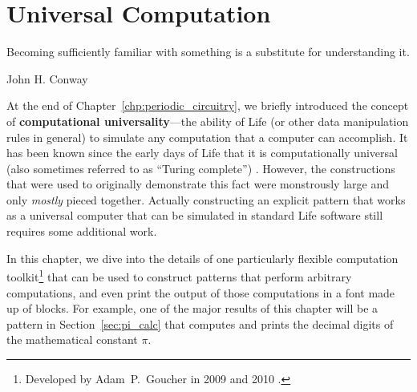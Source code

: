 

\renewcommand{\chapterfolder}{universal_computation/}
\chapter{Universal Computation}\label{chp:universal_computation}


\vspace*{-0.4in}
\epigraph{Becoming sufficiently familiar with something is a substitute for understanding it.}{John H. Conway}
\vspace*{0.4in}


\noindent At the end of Chapter~\ref{chp:periodic_circuitry}, we briefly introduced the concept of \textbf{computational universality}---the ability of Life (or other data manipulation rules in general) to simulate any computation that a computer can accomplish. It has been known since the early days of Life that it is computationally universal (also sometimes referred to as ``Turing complete'') \cite{Wain74,BCG82}.  However, the constructions that were used to originally demonstrate this fact were monstrously large and only \emph{mostly} pieced together. Actually constructing an explicit pattern that works as a universal computer that can be simulated in standard Life software still requires some additional work.

In this chapter, we dive into the details of one particularly flexible computation toolkit\footnote{Developed by Adam~P.~Goucher in 2009 and 2010 \cite{Gou10}.} that can be used to construct patterns that perform arbitrary computations, and even print the output of those computations in a font made up of blocks. For example, one of the major results of this chapter will be a pattern in Section~\ref{sec:pi_calc} that computes and prints the decimal digits of the mathematical constant $\pi$.


